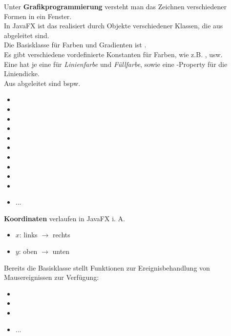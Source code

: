 Unter \textbf{Grafikprogrammierung} versteht man das Zeichnen verschiedener Formen in ein Fenster.\\

\noindent
In JavaFX ist das realisiert durch Objekte verschiedener Klassen, die aus  abgeleitet sind.\\

\noindent
Die Basisklasse für Farben und Gradienten ist .\\

\noindent
Es gibt verschiedene vordefinierte Konstanten für Farben, wie z.B. ,  usw.\\

\noindent
Eine  hat je eine  für \textit{Linienfarbe} und \textit{Füllfarbe}, sowie eine -Property für die Liniendicke.\\

\noindent
Aus  abgeleitet sind bspw.

\begin{itemize}
    \item {}
    \item {}
    \item {}
    \item {}
    \item {}
    \item {}
    \item {}
    \item {}
    \item {}
    \item {}
    \item ...
\end{itemize}

\noindent
\textbf{Koordinaten} verlaufen in JavaFX i. A.

\begin{itemize}
    \item $x$: links $\rightarrow$ rechts
    \item $y$: oben $\rightarrow$ unten
\end{itemize}


\noindent
Bereits die Basisklasse  stellt Funktionen zur Ereignisbehandlung von Mausereignissen zur Verfügung:

\begin{itemize}
    \item {}
    \item {}
    \item {}
    \item ...
\end{itemize}

